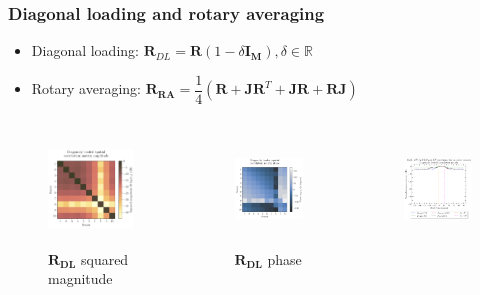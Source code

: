 \documentclass[UKenglish,8pt,aspectratio=1610]{beamer}
\begin{document}
\begin{frame}
	\frametitle{Diagonal loading and rotary averaging}
\begin{itemize}
	\item Diagonal loading: $\mathbf{R}_{DL}=\mathbf{R}(1-\delta \mathbf{I_M}), \delta\in\mathbb{R}$
	\item Rotary averaging: $\mathbf{R_{RA}}=\dfrac{1}{4}\left(\mathbf{R}+\mathbf{J}\mathbf{R}^T+\mathbf{J}\mathbf{R}+\mathbf{R}\mathbf{J}\right)$
\end{itemize}
\vspace{-10pt}
\begin{columns}

	\begin{column}{0.25\textwidth}
		\begin{figure}[h!]
			\centering
			\includegraphics[height=3cm]{question8/matrices/diagonaly_loaded_spatial_correlation_matrix_amplitude.pdf}
			\caption{$\mathbf{R_{DL}}$ squared magnitude}
		\end{figure}
	\end{column}
	\begin{column}{0.25\textwidth}
	\begin{figure}[h!]
		\centering
		\includegraphics[height=3cm]{question8/matrices/diagonaly_loaded_spatial_correlation_matrix_phase.pdf}
		\caption{$\mathbf{R_{DL}}$ phase}
	\end{figure}
\end{column}
	\begin{column}{0.25\textwidth}
	\begin{figure}[h!]
	\centering
	\includegraphics[height=3cm]{question8/spectrums/part_A_question_8_all_spectrums_diagonaly_loaded.pdf}

\end{figure}
\end{column}
\end{columns}
\end{frame}
\end{document}
